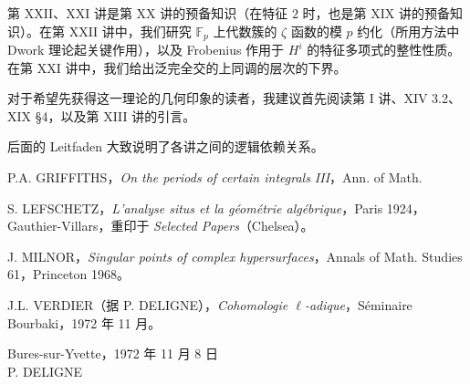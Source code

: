 第 XXII、XXI 讲是第 XX 讲的预备知识（在特征 $2$ 时，也是第 XIX 讲的预备知识）。在第 XXII 讲中，我们研究 $\mathbb F_p$ 上代数簇的 $\zeta$ 函数的模 $p$ 约化（所用方法中 Dwork 理论起关键作用），以及 Frobenius 作用于 $H^i$ 的特征多项式的整性性质。在第 XXI 讲中，我们给出泛完全交的上同调的层次的下界。

对于希望先获得这一理论的几何印象的读者，我建议首先阅读第 I 讲、XIV 3.2、XIX \S4，以及第 XIII 讲的引言。

后面的 Leitfaden 大致说明了各讲之间的逻辑依赖关系。

\medskip
\begin{enumerate}[label={[\arabic*]},leftmargin=2.8em]
\item P.A. GRIFFITHS，\emph{On the periods of certain integrals III}，Ann. of Math.
\item S. LEFSCHETZ，\emph{L'analyse situs et la g\'eom\'etrie alg\'ebrique}，Paris 1924，Gauthier-Villars，重印于 \emph{Selected Papers}（Chelsea）。
\item J. MILNOR，\emph{Singular points of complex hypersurfaces}，Annals of Math. Studies 61，Princeton 1968。
\item J.L. VERDIER（据 P. DELIGNE），\emph{Cohomologie $\ell$-adique}，S\'eminaire Bourbaki，1972 年 11 月。
\end{enumerate}

\vspace{2em}
\begin{flushright}
Bures-sur-Yvette，1972 年 11 月 8 日\\[1.5em]
P. DELIGNE
\end{flushright}
